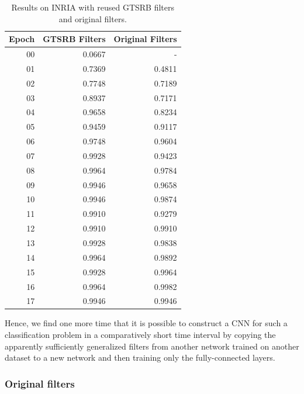 \documentclass[11pt, a4paper]{article}
\begin{document}
\begin{table}[h!]
	\centering
	\begin{tabular}{|r|rr|}
		\hline
		Epoch & GTSRB Filters & Original Filters\\ \hline
		00 & 0.0667 & -\\
		01 & 0.7369 & 0.4811\\
		02 & 0.7748 & 0.7189\\
		03 & 0.8937 & 0.7171\\
		04 & 0.9658 & 0.8234\\
		05 & 0.9459 & 0.9117\\
		06 & 0.9748 & 0.9604\\
		07 & 0.9928 & 0.9423\\
		08 & 0.9964 & 0.9784\\
		09 & 0.9946 & 0.9658\\
		10 & 0.9946 & 0.9874\\
		11 & 0.9910 & 0.9279\\
		12 & 0.9910 & 0.9910\\
		13 & 0.9928 & 0.9838\\
		14 & 0.9964 & 0.9892\\
		15 & 0.9928 & 0.9964\\
		16 & 0.9964 & 0.9982\\
		17 & 0.9946 & 0.9946\\ \hline
	\end{tabular}

	\caption{Results on INRIA with reused GTSRB filters and original filters. }
	\label{tab:inria-results}
\end{table}

Hence, we find one more time that it is possible to construct a CNN for such a classification problem in a comparatively short time interval by copying the apparently sufficiently generalized filters from another network trained on another dataset to a new network and then training only the fully-connected layers.

\subsubsection{Original filters}
\end{document}
